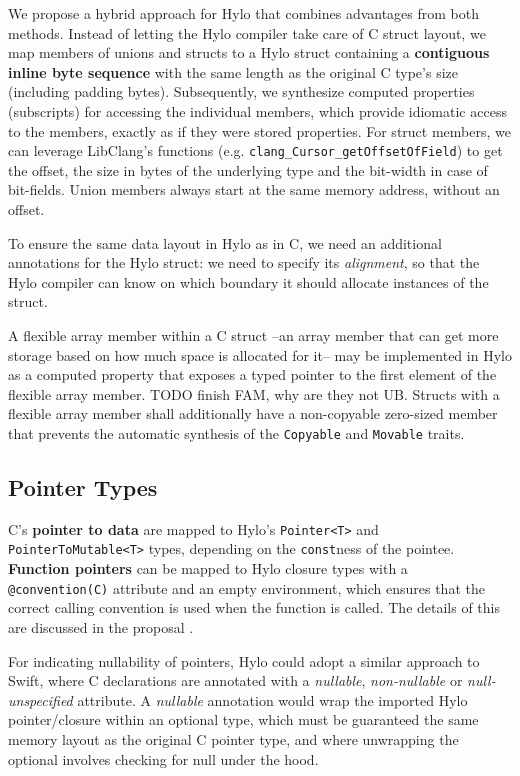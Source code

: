 We propose a hybrid approach for Hylo that combines advantages from both methods. Instead of letting the Hylo compiler take care of C struct layout, we map members of unions and structs to a Hylo struct containing a \textbf{contiguous inline byte sequence} with the same length as the original C type's size (including padding bytes). Subsequently, we synthesize computed properties (subscripts) for accessing the individual members, which provide idiomatic access to the members, exactly as if they were stored properties. For struct members, we can leverage LibClang's functions (e.g. \texttt{clang\_Cursor\_getOffsetOfField}) to get the offset, the size in bytes of the underlying type and the bit-width in case of bit-fields. Union members always start at the same memory address, without an offset\cite{c23-struct-and-union-specifiers}.

To ensure the same data layout in Hylo as in C, we need an additional annotations for the Hylo struct: we need to specify its \textit{alignment}, so that the Hylo compiler can know on which boundary it should allocate instances of the struct.

A flexible array member\cite{fam-wiki} within a C struct --an array member that can get more storage based on how much space is allocated for it-- may be implemented in Hylo as a computed property that exposes a typed pointer to the first element of the flexible array member. TODO finish FAM, why are they not UB. Structs with a flexible array member shall additionally have a non-copyable zero-sized member that prevents the automatic synthesis of the \texttt{Copyable} and \texttt{Movable} traits.

\subsection{Pointer Types}
C's \textbf{pointer to data} are mapped to Hylo's \texttt{Pointer<T>} and \texttt{PointerToMutable<T>} types, depending on the \texttt{const}ness of the pointee. \textbf{Function pointers} can be mapped to Hylo closure types with a \texttt{@convention(C)} attribute and an empty environment, which ensures that the correct calling convention is used when the function is called. The details of this are discussed in the proposal \cite{hylo-function-pointers}.

For indicating nullability of pointers, Hylo could adopt a similar approach to Swift\cite{how-swift-imports-c-nullable}, where C declarations are annotated with a \textit{nullable}, \textit{non-nullable} or \textit{null-unspecified} attribute. A \textit{nullable} annotation would wrap the imported Hylo pointer/closure within an optional type, which must be guaranteed the same memory layout as the original C pointer type, and where unwrapping the optional involves checking for null under the hood.

